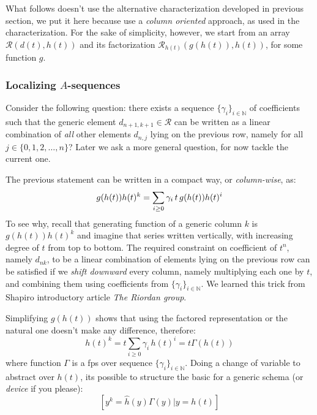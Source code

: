 \documentclass[11pt,a4paper]{article} %
\begin{document}
    What follows doesn't use the alternative characterization developed in 
    previous section, we put it here because use a \emph{column oriented}
    approach, as used in the characterization. For the sake of simplicity,
    however, we start from an array $\mathcal{R}(d(t),h(t))$ and its 
    factorization $\mathcal{R}_{h(t)}(g(h(t)), h(t))$, for some function $g$.
    
    \subsubsection{Localizing $A$-sequences}

    Consider the following question: there exists a sequence 
    $\lbrace \gamma_{i} \rbrace_{i\in\mathbb{N}}$ of coefficients 
    such that the generic element $d_{n+1,k+1}\in\mathcal{R}$ can be written
    as a linear combination of \emph{all} other elements $d_{n,j}$ 
    lying on the previous row, namely for all $j\in\lbrace0,1,2,\ldots,n\rbrace$? 
    Later we ask a more general question, for now tackle the current one.

    The previous statement can be written in a compact way, or \emph{column-wise}, as:
    \begin{displaymath}
        g(h(t))h(t)^k = \sum_{i\geq0}{\gamma_i\,t\,g(h(t)) h(t)^i}\\
    \end{displaymath}
    To see why, recall that generating function of a generic column 
    $k$ is $g(h(t))h(t)^k$ and imagine that series written vertically, 
    with increasing degree of $t$ from top to bottom.
    The required constraint on coefficient of $t^n$, namely $d_{nk}$, 
    to be a linear combination of elements lying on the previous row 
    can be satisfied if we \emph{shift downward} every column,
    namely multiplying each one by $t$, and combining them using coefficients
    from $\lbrace \gamma_{i} \rbrace_{i\in\mathbb{N}}$. 
    We learned this trick from Shapiro introductory article \emph{The Riordan group}.

    Simplifying $g(h(t))$ shows that using the factored representation or
    the natural one doesn't make any difference, therefore:
    \begin{displaymath}
        h(t)^k = t \sum_{i\geq 0}{\gamma_i\,h(t)^i} = t \Gamma(h(t))
    \end{displaymath}
    where function $\Gamma$ is a fps over sequence 
    $\lbrace \gamma_{i} \rbrace_{i\in\mathbb{N}}$.
    Doing a change of variable to abstract over $h(t)$, its possible to
    structure the basic for a generic schema (or \emph{device} if you please):
    \begin{displaymath}
        \left[y^{k} = \hat{h}(y) \Gamma(y) \big| y = h(t) \right]
    \end{displaymath}
    
\end{document}
